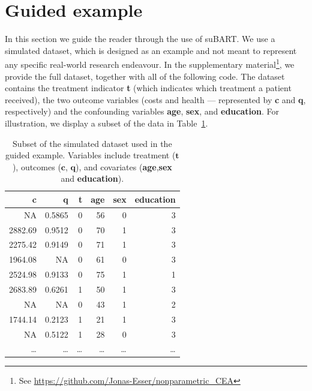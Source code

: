 \documentclass[aoas,preprint]{imsart}
\theoremstyle{plain}
\theoremstyle{definition}
\theoremstyle{remark}
\theoremstyle{remark}
\begin{document}
\section{Guided example}
In this section we guide the reader through the use of suBART. We use a simulated dataset, which is designed as an example and not meant to represent any specific real-world research endeavour. In the supplementary material\footnote{See \url{https://github.com/Jonas-Esser/nonparametric_CEA}}, we provide the full dataset, together with all of the following code.
The dataset contains the treatment indicator \textbf{t} (which indicates which treatment a patient received), the two outcome variables (costs and health --- represented by \textbf{c} and \textbf{q}, respectively) and the confounding variables \textbf{age}, \textbf{sex}, and \textbf{education}. For illustration, we display a subset of the data in Table~\ref{tab:data}.

\begin{table}[ht]
\caption{Subset of the simulated dataset used in the guided example. Variables include treatment ($\mathbf{t}$), outcomes ($\mathbf{c}$, $\mathbf{q}$), and covariates (\textbf{age},\textbf{sex} and \textbf{education}).}
\label{tab:data}
\centering
\begin{tabular}{rrrrrr}
\hline
\textbf{c} & \textbf{q} & \textbf{t} & \textbf{age} & \textbf{sex} & \textbf{education} \\
\hline
NA & 0.5865 & 0 & 56 & 0 & 3 \\
2882.69 & 0.9512 & 0 & 70 & 1 & 3 \\
2275.42 & 0.9149 & 0 & 71 & 1 & 3 \\
1964.08 & NA & 0 & 61 & 0 & 3 \\
2524.98 & 0.9133 & 0 & 75 & 1 & 1 \\
2683.89 & 0.6261 & 1 & 50 & 1 & 3 \\
NA & NA & 0 & 43 & 1 & 2 \\
1744.14 & 0.2123 & 1 & 21 & 1 & 3 \\
NA & 0.5122 & 1 & 28 & 0 & 3 \\
\ldots & \ldots & \ldots & \ldots & \ldots & \ldots \\
\hline
\end{tabular}
\end{table}
\end{document}
